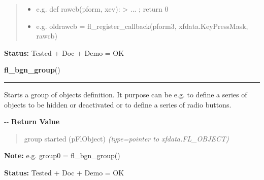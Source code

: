 \begin{boxedminipage}{\funcwidth}
\begin{quote}
\begin{itemize}
  \item
    \setlength{\parskip}{0.6ex}

e.g. def rawcb(pform, xev): > ... ; return 0


  \item 
e.g. oldrawcb = fl\_register\_callback(pform3, xfdata.KeyPressMask,
rawcb)


\end{itemize}

\end{quote}

\textbf{Status:} 
Tested + Doc + Demo = OK


    \end{boxedminipage}

    \label{xformslib:flbasic:fl_bgn_group}

    \vspace{0.5ex}

\hspace{.8\funcindent}\begin{boxedminipage}{\funcwidth}

    \raggedright \textbf{fl\_bgn\_group}()

    \vspace{-1.5ex}

    \rule{\textwidth}{0.5\fboxrule}
\setlength{\parskip}{2ex}

Starts a group of objects definition. It purpose can be e.g. to define
a series of objects to be hidden or deactivated or to define a series of
radio buttons.

-{}-
\setlength{\parskip}{1ex}
      \textbf{Return Value}
    \vspace{-1ex}

      \begin{quote}

group started (pFlObject)
      {\it (type=pointer to xfdata.FL\_OBJECT)}

      \end{quote}

\textbf{Note:} 
e.g. group0 = fl\_bgn\_group()


\textbf{Status:} 
Tested + Doc + Demo = OK


    \end{boxedminipage}

    \label{xformslib:flbasic:fl_end_group}

